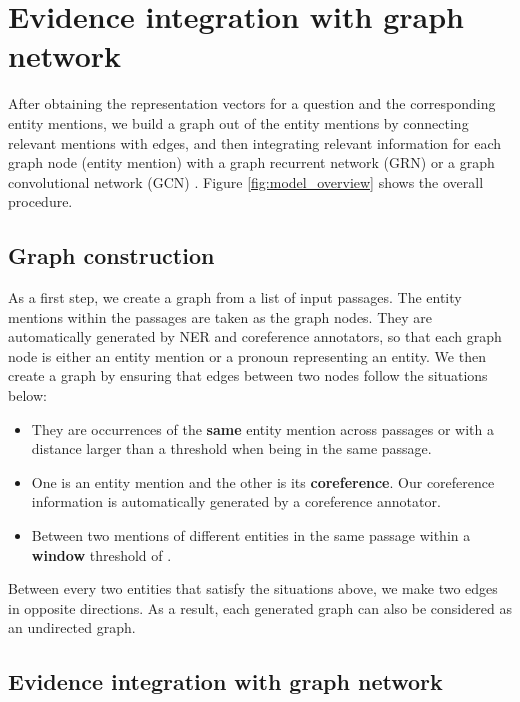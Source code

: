 \documentclass[letterpaper]{article}
\begin{document}
\section{Evidence integration with graph network}


After obtaining the representation vectors for a question and the corresponding entity mentions, we build a graph out of the entity mentions by connecting relevant mentions with edges, and then integrating relevant information for each graph node (entity mention) with a graph recurrent network (GRN) \citep{P18-1030,P18-1150} or a graph convolutional network (GCN) \citep{kipf2017semi}.
Figure \ref{fig:model_overview} shows the overall procedure.

\subsection{Graph construction}

As a first step, we create a graph from a list of input passages.
The entity mentions within the passages are taken as the graph nodes. 
They are automatically generated by NER and coreference annotators, so that each graph node is either an entity mention or a pronoun representing an entity.
We then create a graph by ensuring that edges between two nodes follow the situations below:
\begin{itemize}
\item They are occurrences of the \textbf{same} entity mention across passages or with a distance larger than a threshold  when being in the same passage.
\item One is an entity mention and the other is its \textbf{coreference}. Our coreference information is automatically generated by a coreference annotator.
\item Between two mentions of different entities in the same passage within a \textbf{window} threshold of .
\end{itemize}
Between every two entities that satisfy the situations above, we make two edges in opposite directions. 
As a result, each generated graph can also be considered as an undirected graph.





\subsection{Evidence integration with graph network}
\end{document}
